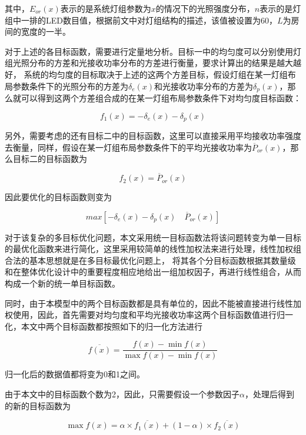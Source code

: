 其中，$E_{or}(x)$表示的是系统灯组参数为$x$的情况下的光照强度分布，$n$表示的是灯组中一排的LED数目值，根据前文中对灯组结构的描述，该值被设置为60，$L$为房间的宽度的一半。

对于上述的各目标函数，需要进行定量地分析。目标一中的均匀度可以分别使用灯组光照分布的方差和光接收功率分布的方差进行衡量，要求计算出的结果是越大越好，
系统的均匀度的目标取决于上述的这两个方差目标，假设灯组在某一灯组布局参数条件下的光照分布的方差为$\delta_{e}(x)$和光接收功率分布的方差为$\delta_{p}(x)$，那么就可以得到这两个方差组合成的在某一灯组布局参数条件下对均匀度目标函数：

\begin{equation}
    f_{1}(x)=-\delta_{e}(x)-\delta_{p}(x)
\end{equation}

另外，需要考虑的还有目标二中的目标函数，这里可以直接采用平均接收功率强度去衡量，同样，假设在某一灯组布局参数条件下的平均光接收功率为$\overline{P}_{or}(x)$，那么目标二的目标函数为

\begin{equation}
    f_{2}(x)=\overline{P}_{or}(x)
\end{equation}

因此要优化的目标函数则变为

\begin{equation}
    max \left[-\delta_{e}(x)-\delta_{p}(x)\quad \overline{P}_{or}(x) \right]
\end{equation}

对于该复杂的多目标优化问题，本文采用统一目标函数法将该问题转变为单一目标的最优化函数来进行简化，这里采用较简单的线性加权法来进行处理，线性加权组合法的基本思想就是在多目标最优化问题上，
将其各个分目标函数根据其数量级和在整体优化设计中的重要程度相应地给出一组加权因子，再进行线性组合，从而构成一个新的统一单目标函数。

同时，由于本模型中的两个目标函数都是具有单位的，因此不能被直接进行线性加权使用，因此，首先需要对均匀度和平均光接收功率这两个目标函数值进行归一化，本文中两个目标函数都按照如下的归一化方法进行

\begin{equation}
    \overline {f(x)}  = \frac{{f(x) - \min f(x)}}{{\max f(x) - \min f(x)}}
\end{equation}

归一化后的数据值都将变为0和1之间。

由于本文中的目标函数个数为2，因此，只需要假设一个参数因子$\alpha$，处理后得到的新的目标函数为

\begin{equation}
    \max f(x) = \alpha  \times \overline {{f_1}(x)}  + (1 - \alpha ) \times \overline {{f_2}(x)}
\end{equation}

